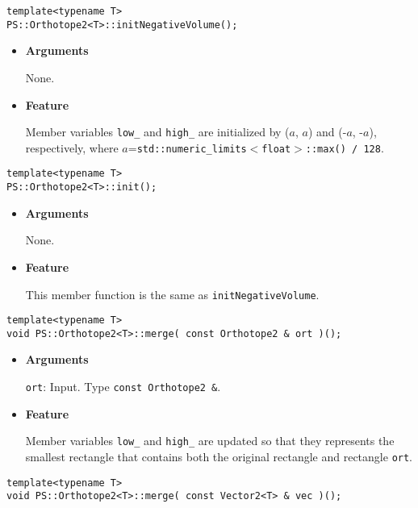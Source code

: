 \begin{screen}
\begin{verbatim}
template<typename T>
PS::Orthotope2<T>::initNegativeVolume();
\end{verbatim}
\end{screen}

\begin{itemize}

\item{{\bf Arguments}}

None.

\item{{\bf Feature}}

Member variables \texttt{low\_} and \texttt{high\_} are initialized by ($a$, $a$) and (-$a$, -$a$), respectively,
where $a$=\texttt{std::numeric\_limits$<$float$>$::max() / 128}.

\end{itemize}

\begin{screen}
\begin{verbatim}
template<typename T>
PS::Orthotope2<T>::init();
\end{verbatim}
\end{screen}

\begin{itemize}

\item{{\bf Arguments}}

None.

\item{{\bf Feature}}

This member function is the same as \texttt{initNegativeVolume}.

\end{itemize}

\begin{screen}
\begin{verbatim}
template<typename T>
void PS::Orthotope2<T>::merge( const Orthotope2 & ort )();
\end{verbatim}
\end{screen}

\begin{itemize}

\item{{\bf Arguments}}

\texttt{ort}: Input. Type \texttt{const Orthotope2 \&}.

\item{{\bf Feature}}

Member variables \texttt{low\_} and \texttt{high\_} are updated so that they represents the smallest rectangle that contains both the original rectangle and rectangle \texttt{ort}.

\end{itemize}
\begin{screen}
\begin{verbatim}
template<typename T>
void PS::Orthotope2<T>::merge( const Vector2<T> & vec )();
\end{verbatim}
\end{screen}

